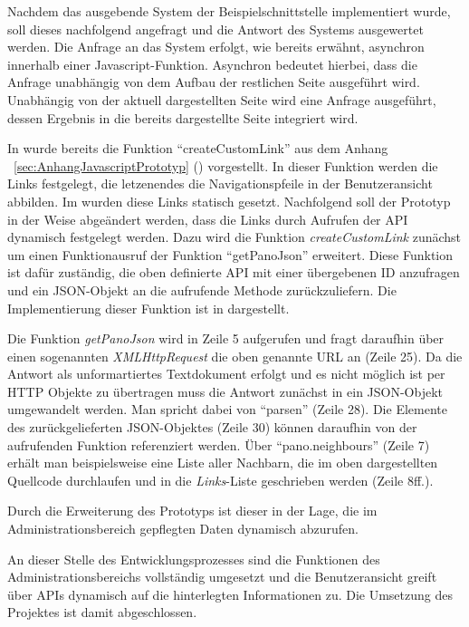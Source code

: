 Nachdem das ausgebende System der Beispielschnittstelle implementiert wurde,
soll dieses nachfolgend angefragt und die Antwort des Systems ausgewertet
werden. Die Anfrage an das System erfolgt, wie bereits erwähnt, asynchron
innerhalb einer Javascript-Funktion. Asynchron bedeutet hierbei, dass die
Anfrage unabhängig von dem Aufbau der restlichen Seite ausgeführt wird.
Unabhängig von der aktuell dargestellten Seite wird eine Anfrage ausgeführt,
dessen Ergebnis in die bereits dargestellte Seite integriert wird.

In  wurde bereits die Funktion "`createCustomLink"' aus dem
Anhang ~\ref{sec:AnhangJavascriptPrototyp}
() vorgestellt. In dieser Funktion
werden die Links festgelegt, die letzenendes die Navigationspfeile in der
Benutzeransicht abbilden. Im  wurden diese Links statisch
gesetzt. Nachfolgend soll der Prototyp in der Weise abgeändert werden, dass die
Links durch Aufrufen der API dynamisch festgelegt werden. Dazu wird die Funktion
\textit{createCustomLink} zunächst um einen Funktionausruf der Funktion
"`getPanoJson"' erweitert. Diese Funktion ist dafür zuständig, die oben
definierte API mit einer übergebenen ID anzufragen und ein JSON-Objekt an die
aufrufende Methode zurückzuliefern. Die Implementierung dieser Funktion ist in
 dargestellt.

\clearpage



Die Funktion \textit{getPanoJson} wird in Zeile 5 aufgerufen und fragt daraufhin
über einen sogenannten \textit{XMLHttpRequest} die oben genannte URL an (Zeile
25). Da die Antwort als unformartiertes Textdokument erfolgt und es nicht
möglich ist per HTTP Objekte zu übertragen muss die Antwort zunächst in ein
JSON-Objekt umgewandelt werden. Man spricht dabei von "`parsen"' (Zeile 28). Die
Elemente des zurückgelieferten JSON-Objektes (Zeile 30) können daraufhin von der
aufrufenden Funktion referenziert werden. Über "`pano.neighbours"' (Zeile 7)
erhält man beispielsweise eine Liste aller Nachbarn, die im oben dargestellten
Quellcode durchlaufen und in die \textit{Links}-Liste geschrieben werden (Zeile
8ff.).

Durch die Erweiterung des Prototyps ist dieser in der Lage, die im
Administrationsbereich gepflegten Daten dynamisch abzurufen.

An dieser Stelle des Entwicklungsprozesses sind die Funktionen des
Administrationsbereichs vollständig umgesetzt und die Benutzeransicht greift
über APIs dynamisch auf die hinterlegten Informationen zu. Die Umsetzung des
Projektes ist damit abgeschlossen.